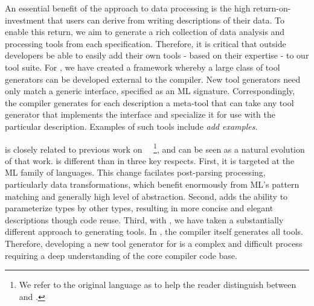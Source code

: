 An essential benefit of the \pads{} approach to data processing is the
high return-on-investment that users can derive from writing 
descriptions of their data. To enable this return, we aim to generate
a rich collection of data analysis and processing tools from each
specification. Therefore, it is critical that outside
developers be able to easily add their own tools - based on their
expertise - to our tool suite.  For \padsml{}, we have created
a framework whereby a large class of tool
generators can be developed external to the compiler.  New tool
generators need only match a generic interface, specified as an ML
signature. Correspondingly, the compiler generates for each
description a meta-tool that can take any tool generator that
implements the interface and specialize it for use with the particular
description.  Examples of such tools include {\em add examples}.

\padsml{} is closely related to previous work on
\padsc{}~\cite{fisher+:pads}~\footnote{We refer to the original \pads{}
  language as \padsc{} to help the reader distinguish between \padsc{}
  and \padsml{}.}, and can be seen as a natural evolution of that
work.  \padsml{} is different than \padsc{} in three key respects.
First, it is targeted at the ML family of languages. 
This change facilates post-parsing processing, particularly data
transformations, which benefit enormously from ML's pattern matching
and generally high level of abstraction. 
Second, \padsml{}
adds the ability to parameterize types by other types, resulting in
more concise and elegant descriptions though code reuse. Third, with
\padsml{}, we have taken a substantially different approach to
generating tools. In \padsc{}, the compiler itself generates all
tools.  Therefore,
developing a new tool generator for \padsc{} is a complex and
difficult process requiring a deep understanding of the core compiler
code base.


